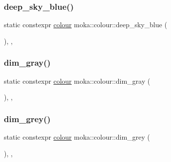\subsubsection{\texorpdfstring{deep\_sky\_blue()}{deep\_sky\_blue()}}
{\footnotesize\ttfamily static constexpr \mbox{\hyperlink{classmoka_1_1colour}{colour}} moka\+::colour\+::deep\+\_\+sky\+\_\+blue (\begin{DoxyParamCaption}{ }\end{DoxyParamCaption})\hspace{0.3cm}{\ttfamily [inline]}, {\ttfamily [static]}, {\ttfamily [noexcept]}}

\mbox{\label{classmoka_1_1colour_a9a864e4849feee6ccb73f8f6b95d6dc8}} 
\subsubsection{\texorpdfstring{dim\_gray()}{dim\_gray()}}
{\footnotesize\ttfamily static constexpr \mbox{\hyperlink{classmoka_1_1colour}{colour}} moka\+::colour\+::dim\+\_\+gray (\begin{DoxyParamCaption}{ }\end{DoxyParamCaption})\hspace{0.3cm}{\ttfamily [inline]}, {\ttfamily [static]}, {\ttfamily [noexcept]}}

\mbox{\label{classmoka_1_1colour_a92fa8002004604d641f9ba491e7ab17c}} 
\subsubsection{\texorpdfstring{dim\_grey()}{dim\_grey()}}
{\footnotesize\ttfamily static constexpr \mbox{\hyperlink{classmoka_1_1colour}{colour}} moka\+::colour\+::dim\+\_\+grey (\begin{DoxyParamCaption}{ }\end{DoxyParamCaption})\hspace{0.3cm}{\ttfamily [inline]}, {\ttfamily [static]}, {\ttfamily [noexcept]}}

\mbox{\label{classmoka_1_1colour_a7699a78883a1ca7228aa6ad708f0d5a6}} 
